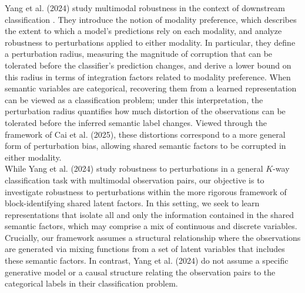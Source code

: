 \documentclass[a4paper,12pt]{article}
\begin{document}
Yang et al. (2024) study multimodal robustness in the context of downstream classification \cite{ICLR2024_45a9d429}. They introduce the notion of modality preference, which describes the extent to which a model’s predictions rely on each modality, and analyze robustness to perturbations applied to either modality. In particular, they define a perturbation radius, measuring the magnitude of corruption that can be tolerated before the classifier’s prediction changes, and derive a lower bound on this radius in terms of integration factors related to modality preference. When semantic variables are categorical, recovering them from a learned representation can be viewed as a classification problem; under this interpretation, the perturbation radius quantifies how much distortion of the observations can be tolerated before the inferred semantic label changes. Viewed through the framework of Cai et al. (2025), these distortions correspond to a more general form of perturbation bias, allowing shared semantic factors to be corrupted in either modality. \\

While Yang et al. (2024) study robustness to perturbations in a general $K$-way classification task with multimodal observation pairs, our objective is to investigate robustness to perturbations within the more rigorous framework of block-identifying shared latent factors. In this setting, we seek to learn representations that isolate all and only the information contained in the shared semantic factors, which may comprise a mix of continuous and discrete variables. Crucially, our framework assumes a structural relationship where the observations are generated via mixing functions from a set of latent variables that includes these semantic factors. In contrast, Yang et al. (2024) do not assume a specific generative model or a causal structure relating the observation pairs to the categorical labels in their classification problem.

\newpage


\end{document}

